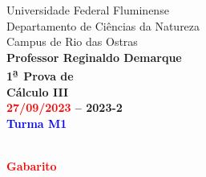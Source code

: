 \documentclass[a4paper,addpoints,12pt]{exam}
\newcommand{\fm}{\textsuperscript{\b{a}\ }}
\begin{document}
	

{\sc \scriptsize Universidade Federal Fluminense \\
Departamento de Ciências da Natureza\\
Campus de Rio das Ostras \\
\textbf{Professor Reginaldo Demarque}\\}
{\scriptsize 
\textbf{{\color{red} 1\fm Prova de}}\\
\textbf{Cálculo III}\\
\textbf{\textcolor{red}{27/09/2023} -- 2023-2}\\
\textbf{\textcolor{blue}{Turma M1}}\\
}
	
	
	\ifprintanswers
	\begin{center}
		\noindent \\
	{\Large \textbf{\textcolor{red}{Gabarito}}}\\
	\end{center}
	\noindent \hrulefill  
\end{document}
